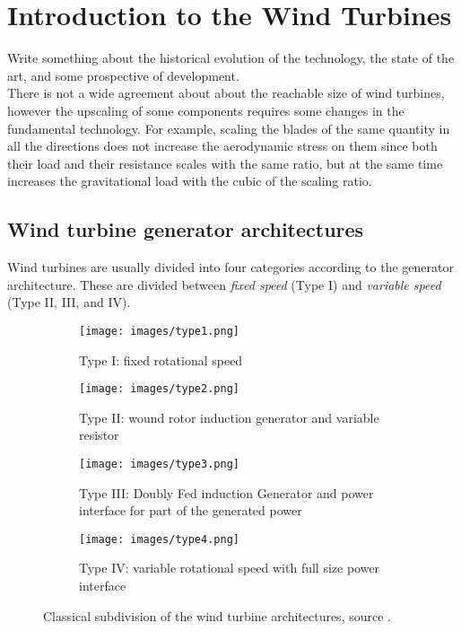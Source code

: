 \newpage
\section{Introduction to the Wind Turbines}\label{sec:c_WT_characteristics}
Write something about the historical evolution of the technology, the state of the art, and some prospective of development. \\
There is not a wide agreement about about the reachable size of wind turbines, however the upscaling of some components requires some changes in the fundamental technology. For example, scaling the blades of the same quantity in all the directions does not increase the aerodynamic stress on them since both their load and their resistance scales with the same ratio, but at the same time increases the gravitational load with the cubic of the scaling ratio. \\

\subsection{Wind turbine generator architectures}
Wind turbines are usually divided into four categories according to the generator architecture. These are divided between \textit{fixed speed} (Type I) and \textit{variable speed} (Type II, III, and IV). 
\begin{figure}[htb]
  \centering
  \begin{subfigure}{0.49\columnwidth}
    \texttt{[image: images/type1.png]}
    \caption{Type I: fixed rotational speed}
    \label{fig:type1}
  \end{subfigure}
  \begin{subfigure}{0.49\columnwidth}
    \texttt{[image: images/type2.png]}
    \caption{Type II: wound rotor induction generator and variable resistor}
    \label{fig:type2}
  \end{subfigure}
  \begin{subfigure}{0.49\columnwidth}
    \texttt{[image: images/type3.png]}
    \caption{Type III: Doubly Fed induction Generator and power interface for part of the generated power}
    \label{fig:type3}
  \end{subfigure}
  \begin{subfigure}{0.49\columnwidth}
    \texttt{[image: images/type4.png]}
    \caption{Type IV: variable rotational speed with full size power interface}
    \label{fig:type4}
  \end{subfigure}
  \caption{Classical subdivision of the wind turbine architectures, source \cite{Burman2011IntegratingRE}. }
\end{figure}

